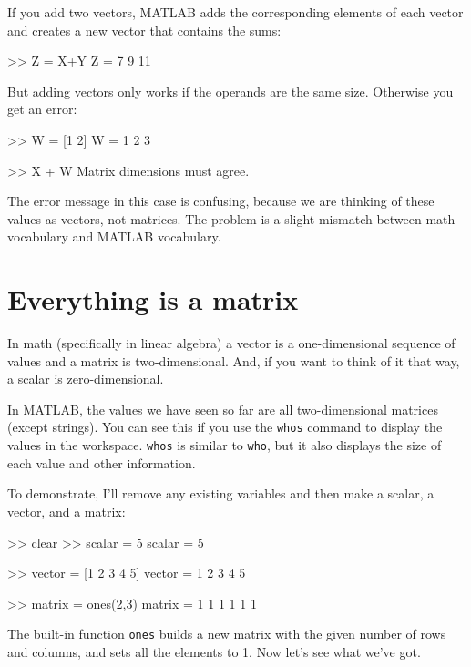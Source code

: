 \documentclass[
]{book}
\numberwithin{Answer}{chapter}
\numberwithin{Exercise}{chapter}
\begin{document}
If you add two vectors, MATLAB adds the corresponding elements of each
vector and creates a new vector that contains the sums:

\begin{code}
>> Z = X+Y
Z = 7     9    11
\end{code}

But adding vectors only works if the operands are the same size.
Otherwise you get an error:

\begin{code}
>> W = [1 2]
W = 1     2     3

>> X + W
Matrix dimensions must agree.
\end{code}

The error message in this case is confusing, because we are thinking
of these values as vectors, not matrices.  The problem is a slight
mismatch between math vocabulary and MATLAB vocabulary.


\section{Everything is a matrix}

In math (specifically in linear algebra) a vector is a one-dimensional
sequence of values and a matrix is two-dimensional. And, if you want
to think of it that way, a scalar is zero-dimensional.


In MATLAB, the values we have seen so far are all two-dimensional matrices (except strings).
You can see this if you use the {\tt whos} command to display the
values in the workspace.  {\tt whos} is similar to {\tt who}, but it also displays the size of each value and other information.


To demonstrate, I'll remove any existing variables and then 
make a scalar, a vector, and a matrix:

\begin{code}
>> clear
>> scalar = 5
scalar = 5

>> vector = [1 2 3 4 5]
vector = 1     2     3     4     5

>> matrix = ones(2,3)
matrix =
     1     1     1
     1     1     1
\end{code}

The built-in function {\tt ones} builds a new matrix with the given
number of rows and columns, and sets all the elements to 1.
Now let's see what we've got.
\end{document}
